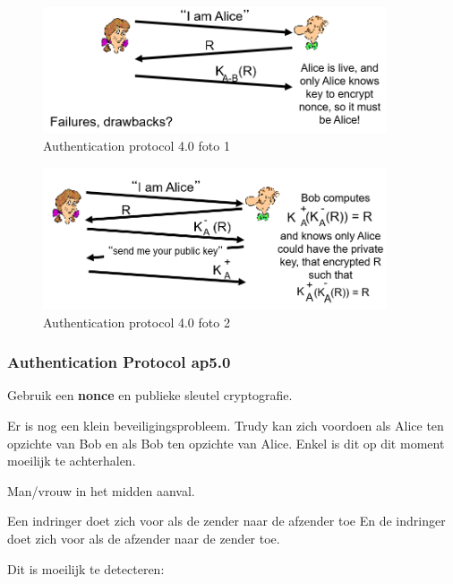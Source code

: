 \begin{figure}[h]
    \centering
    \includegraphics[width=4in]{./img/imghfdst8/hfdst8puntje20.png}
    \caption{Authentication protocol 4.0 foto 1 }      
    \label{fig:Authentication protocol 4.0 foto 1 }
\end{figure}

\begin{figure}[h]
    \centering
    \includegraphics[width=4in]{./img/imghfdst8/hfdst8puntje21.png}
    \caption{Authentication protocol 4.0 foto 2 }      
    \label{fig:Authentication protocol 4.0 foto 2 }
\end{figure}
 
\newpage

\subsubsection{Authentication Protocol ap5.0}

\noindent Gebruik een \textbf{nonce} en publieke sleutel cryptografie.

\noindent Er is nog een klein beveiligingsprobleem. Trudy kan zich voordoen als Alice ten opzichte van Bob en als Bob ten opzichte van Alice. Enkel is dit op dit moment moeilijk te achterhalen.


\noindent Man/vrouw in het midden aanval.

\fra Een indringer doet zich voor als de zender naar de afzender toe
\fra En de indringer doet zich voor als de afzender naar de zender toe.

\noindent Dit is moeilijk te detecteren:

